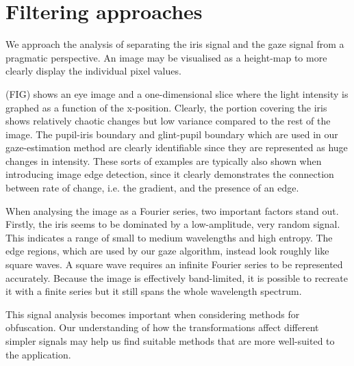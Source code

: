 \section{Filtering approaches}
We approach the analysis of separating the iris signal and the gaze signal from a pragmatic perspective. An image may be visualised as a height-map to more clearly display the individual pixel values. 

(FIG) shows an eye image and a one-dimensional slice where the light intensity is graphed as a function of the x-position. Clearly, the portion covering the iris shows relatively chaotic changes but low variance compared to the rest of the image. The pupil-iris boundary and glint-pupil boundary which are used in our gaze-estimation method are clearly identifiable since they are represented as huge changes in intensity. These sorts of examples are typically also shown when introducing image edge detection, since it clearly demonstrates the connection between rate of change, i.e. the gradient, and the presence of an edge. 

When analysing the image as a Fourier series, two important factors stand out. Firstly, the iris seems to be dominated by a low-amplitude, very random signal. This indicates a range of small to medium wavelengths and high entropy. The edge regions, which are used by our gaze algorithm, instead look roughly like square waves. A square wave requires an infinite Fourier series to be represented accurately. Because the image is effectively band-limited, it is possible to recreate it with a finite series but it still spans the whole wavelength spectrum.

This signal analysis becomes important when considering methods for obfuscation. Our understanding of how the transformations affect different simpler signals may help us find suitable methods that are more well-suited to the application.





